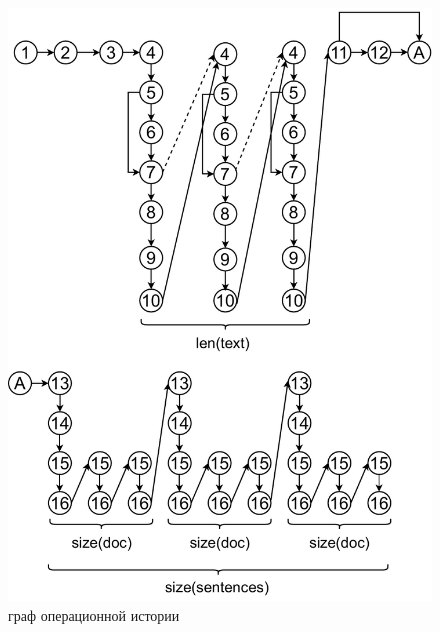 \begin{figure}[h!]
	\centering
	\includegraphics[width=0.9\linewidth]{img/oi}
	\caption{граф операционной истории}
	\label{fig:oper_his}
\end{figure}

